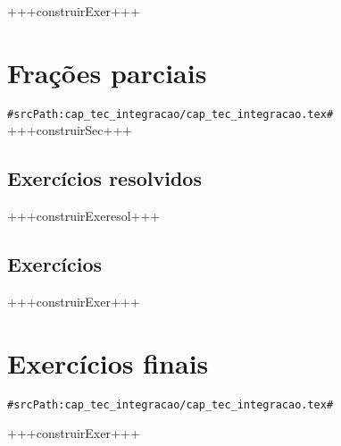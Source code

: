 +++construirExer+++


\section{Frações parciais}
\verb+#srcPath:cap_tec_integracao/cap_tec_integracao.tex#+
+++construirSec+++


\subsection*{Exercícios resolvidos}

+++construirExeresol+++


\subsection*{Exercícios}

+++construirExer+++

\section{Exercícios finais}
\verb+#srcPath:cap_tec_integracao/cap_tec_integracao.tex#+


+++construirExer+++



